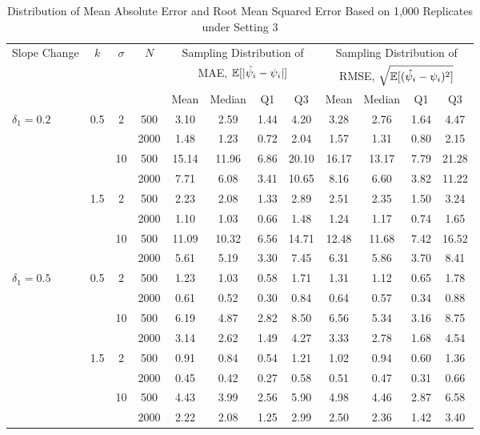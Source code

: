 \documentclass [12pt, proquest] {uwthesis}[2016/11/22]
\begin{document}
\begin{table}
\centering
\renewcommand\arraystretch{0.75}
\begin{tabular}{@{} lccccccccccc @{}} 
\toprule
    {Slope Change} & {$k$} & $\sigma$ & $N$ & \multicolumn{4}{c}{Sampling Distribution of} & \multicolumn{4}{c}{Sampling Distribution of} \\
    & & & & \multicolumn{4}{c}{MAE, $\mathbb{E}[\lvert \Hat{\psi_i} - \psi_i \rvert]$} & \multicolumn{4}{c}{RMSE, $\sqrt{\mathbb{E}[(\Hat{\psi_i} - \psi_i)^2]}$}\\
    \cmidrule(lr){5-8} \cmidrule(lr){9-12}
     & & & & Mean & Median & Q1 & Q3 & Mean & Median & Q1 & Q3 \\
\midrule
    $\delta_1 = 0.2$ & 0.5 & 2 & 500 & 3.10 & 2.59 & 1.44 & 4.20 & 3.28 & 2.76 & 1.64 & 4.47 \\
                     &     &   & 2000 & 1.48 & 1.23 & 0.72 & 2.04 & 1.57 & 1.31 & 0.80 & 2.15  \\
                     &     & 10 & 500 & 15.14 & 11.96 & 6.86 & 20.10 & 16.17 & 13.17 & 7.79 & 21.28 \\
                     &     &    & 2000 & 7.71 & 6.08 & 3.41 & 10.65 & 8.16 & 6.60 & 3.82 & 11.22 \\
                     & 1.5 & 2 & 500 & 2.23 & 2.08 & 1.33 & 2.89 & 2.51 & 2.35 & 1.50 & 3.24 \\
                     &     &   & 2000 & 1.10 & 1.03 & 0.66 & 1.48 & 1.24 & 1.17 & 0.74 & 1.65 \\
                     &     & 10 & 500 & 11.09 & 10.32 & 6.56 & 14.71 & 12.48 & 11.68 & 7.42 & 16.52 \\
                     &     &    & 2000 & 5.61 & 5.19 & 3.30 & 7.45 & 6.31 & 5.86 & 3.70 & 8.41 \\
\midrule
    $\delta_1 = 0.5$ & 0.5 & 2 & 500 & 1.23 & 1.03 & 0.58 & 1.71 & 1.31 & 1.12 & 0.65 & 1.78  \\
                     &     &   & 2000 & 0.61 & 0.52 & 0.30 & 0.84 & 0.64 & 0.57 & 0.34 & 0.88 \\
                     &     & 10 & 500 & 6.19 & 4.87 & 2.82 & 8.50 & 6.56 & 5.34 & 3.16 & 8.75 \\
                     &     &     & 2000 & 3.14 & 2.62 & 1.49 & 4.27 & 3.33 & 2.78 & 1.68 & 4.54 \\
                     & 1.5 & 2 & 500 & 0.91 & 0.84 & 0.54 & 1.21 & 1.02 & 0.94 & 0.60 & 1.36 \\
                     &     &     & 2000 & 0.45 & 0.42 & 0.27 & 0.58 & 0.51 & 0.47 & 0.31 & 0.66 \\
                     &     & 10 & 500 & 4.43 & 3.99 & 2.56 & 5.90 & 4.98 & 4.46 & 2.87 & 6.58 \\
                     &     &     & 2000 & 2.22 & 2.08 & 1.25 & 2.99 & 2.50 & 2.36 & 1.42 & 3.40 \\    
\bottomrule
\end{tabular}
\caption{Distribution of Mean Absolute Error and Root Mean Squared Error Based on 1,000 Replicates under Setting 3}
\end{table}
\end{document}

